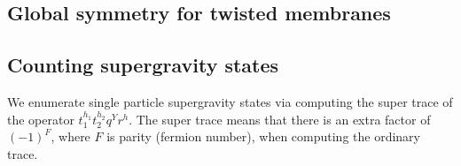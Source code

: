 \documentclass[11pt]{amsart}
\begin{document}

\subsection{Global symmetry for twisted membranes}

\subsection{Counting supergravity states}

We enumerate single particle supergravity states via computing the super trace of the operator $t_1^{h_1} t_2^{h_2} q^Y r^h$. 
The super trace means that there is an extra factor of $(-1)^F$, where $F$ is parity (fermion number), when computing the ordinary trace.

\parsec[s:pexp]


%
%
\end{document}
